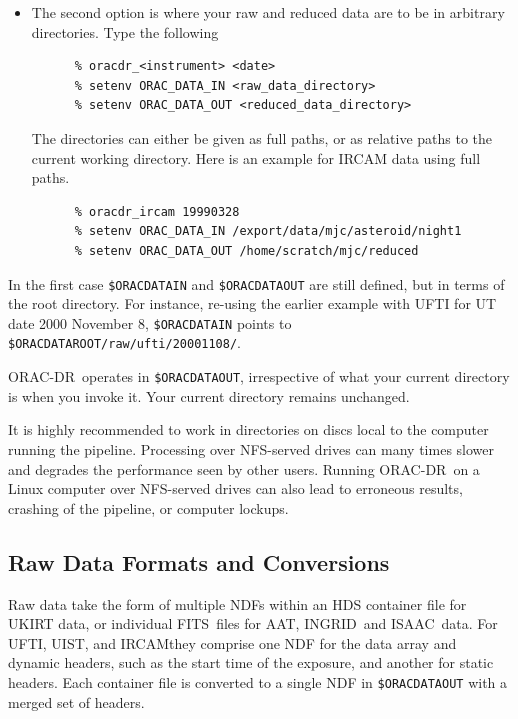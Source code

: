 \documentclass[twoside,11pt]{article}
\newcommand{\htmladdnormallink}[2]{#1}
\newcommand{\xref}[3]{#1}
\newcommand{\xlabel}[1]{}
\renewcommand{\_}{\texttt{\symbol{95}}}
\newcommand{\ORACDR}{{\footnotesize ORAC-DR}}
\newcommand{\FITSref}{\htmladdnormallink{FITS}{http://fits.gsfc.nasa.gov/}}
\newcommand{\AAT}{\htmladdnormallink{AAT}{http://www.aao.gov.au/}}
\newcommand{\INGRID}{\htmladdnormallink{INGRID}{http://www.ing.iac.es/Astronomy/instruments/ingrid/}}
\newcommand{\IRCAM}{\htmladdnormallink{IRCAM}{http://www.jach.hawaii.edu/JACpublic/UKIRT/instruments/ircam/ircam3.html}}
\newcommand{\ISAAC}{\htmladdnormallink{ISAAC}{http://www.eso.org/instruments/isaac/}}
\newcommand{\UIST}{\htmladdnormallink{UIST}{http://www.jach.hawaii.edu/JACpublic/UKIRT/instruments/uist/uist.html}}
\newcommand{\UFTI}{\htmladdnormallink{UFTI}{http://www.jach.hawaii.edu/JACpublic/UKIRT/instruments/ufti/ufti.html}}
\begin{document}
\begin{itemize}
\item The second option is where your raw and reduced data are to be
in arbitrary directories.  Type the following

\begin{verbatim}
      % oracdr_<instrument> <date>
      % setenv ORAC_DATA_IN <raw_data_directory>
      % setenv ORAC_DATA_OUT <reduced_data_directory>
\end{verbatim}

The directories can either be given as full paths, or as relative paths
to the current working directory.  Here is an example for IRCAM data using
full paths.
\begin{verbatim}
      % oracdr_ircam 19990328
      % setenv ORAC_DATA_IN /export/data/mjc/asteroid/night1
      % setenv ORAC_DATA_OUT /home/scratch/mjc/reduced
\end{verbatim}

\end{itemize}
In the first case {\tt \$ORAC\_DATA\_IN} and {\tt \$ORAC\_DATA\_OUT} are
still defined, but in terms of the root directory.  For instance, re-using
the earlier example with UFTI for UT date 2000 November 8,
{\tt \$ORAC\_DATA\_IN} points to {\tt \$ORAC\_DATA\_ROOT/raw/ufti/20001108/}.

\ORACDR\ operates in {\tt \$ORAC\_DATA\_OUT}, irrespective of
what your current directory is when you invoke it.   Your current
directory remains unchanged.  

It is highly recommended to work in directories on discs local to
the computer running the pipeline.  Processing over NFS-served drives
can many times slower and degrades the performance seen by other users.
Running \ORACDR\ on a Linux computer over NFS-served drives can also
lead to erroneous results, crashing of the pipeline, or computer lockups.

\subsection{\xlabel{raw_data_formats_and_conversions}Raw Data Formats
and Conversions\label{raw_data_formats_and_conversions}}

Raw data take the form of multiple NDFs within an
\xref{HDS container file}{sun92}{} for UKIRT data, or individual
\FITSref\ files
for \AAT, \INGRID\ and \ISAAC\ data.  For \UFTI, \UIST, and \IRCAM they
comprise one NDF for the data array and dynamic headers, such as the
start time of the exposure, and another for static headers.  Each
container file is converted to a single NDF in {\tt \$ORAC\_DATA\_OUT}
with a merged set of headers.
\end{document}
